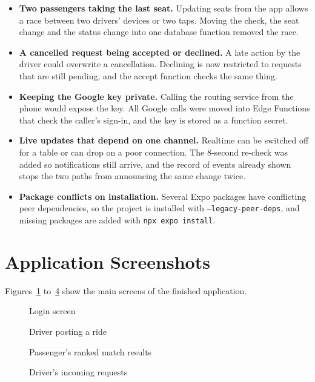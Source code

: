 \begin{itemize}
  \item \textbf{Two passengers taking the last seat.} Updating seats from the app allows a race between two drivers' devices or two taps. Moving the check, the seat change and the status change into one database function removed the race.
  \item \textbf{A cancelled request being accepted or declined.} A late action by the driver could overwrite a cancellation. Declining is now restricted to requests that are still pending, and the accept function checks the same thing.
  \item \textbf{Keeping the Google key private.} Calling the routing service from the phone would expose the key. All Google calls were moved into Edge Functions that check the caller's sign-in, and the key is stored as a function secret.
  \item \textbf{Live updates that depend on one channel.} Realtime can be switched off for a table or can drop on a poor connection. The 8-second re-check was added so notifications still arrive, and the record of events already shown stops the two paths from announcing the same change twice.
  \item \textbf{Package conflicts on installation.} Several Expo packages have conflicting peer dependencies, so the project is installed with \texttt{--legacy-peer-deps}, and missing packages are added with \texttt{npx expo install}.
\end{itemize}
 
\section{Application Screenshots}
 
Figures~\ref{fig:shot-login} to~\ref{fig:shot-requests} show the main screens of the finished application. %
 
\begin{figure}[htbp]
  \centering
  \caption{Login screen}
  \label{fig:shot-login}
\end{figure}
 
\begin{figure}[htbp]
  \centering
  \caption{Driver posting a ride}
  \label{fig:shot-post}
\end{figure}
 
\begin{figure}[htbp]
  \centering
  \caption{Passenger's ranked match results}
  \label{fig:shot-find}
\end{figure}
 
\begin{figure}[htbp]
  \centering
  \caption{Driver's incoming requests}
  \label{fig:shot-requests}
\end{figure}

